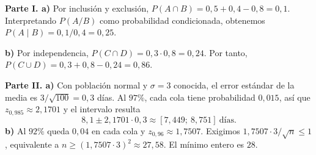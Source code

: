 \textbf{Parte I. a)} Por inclusión y exclusión, $P(A\cap B)=0{,}5+0{,}4-0{,}8=0{,}1$. Interpretando $P(A/B)$ como probabilidad condicionada, obtenemos $P(A\mid B)=0{,}1/0{,}4=\boxed{0{,}25}$.

\textbf{b)} Por independencia, $P(C\cap D)=0{,}3\cdot0{,}8=0{,}24$. Por tanto, $P(C\cup D)=0{,}3+0{,}8-0{,}24=\boxed{0{,}86}$.

\textbf{Parte II. a)} Con población normal y $\sigma=3$ conocida, el error estándar de la media es $3/\sqrt{100}=0{,}3$ días. Al $97\%$, cada cola tiene probabilidad $0{,}015$, así que $z_{0{,}985}\approx2{,}1701$ y el intervalo resulta
\[
 8{,}1\pm2{,}1701\cdot0{,}3
 \approx\boxed{[7{,}449;\ 8{,}751]}\ \text{días}.
\]
\textbf{b)} Al $92\%$ queda $0{,}04$ en cada cola y $z_{0{,}96}\approx1{,}7507$. Exigimos $1{,}7507\cdot3/\sqrt n\le1$, equivalente a $n\ge(1{,}7507\cdot3)^2\approx27{,}58$. El mínimo entero es $\boxed{28}$.
